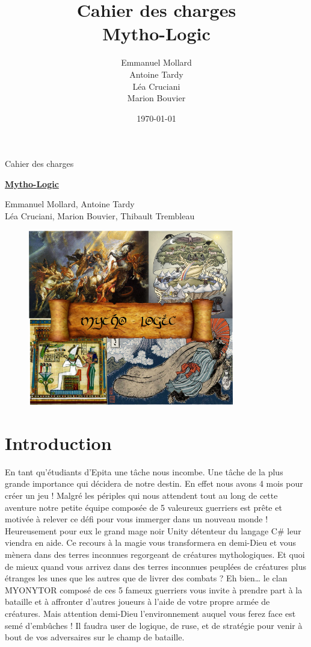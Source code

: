 \documentclass[12pt]{extarticle}
\author{Emmanuel Mollard \\ Antoine Tardy \\ Léa Cruciani \\ Marion Bouvier}
\title{Cahier des charges\\Mytho-Logic}
\date{\today}
\begin{document}
\begin{center}\large
	Cahier des charges \vspace{0.5cm}
\end{center}

\begin{center}\Huge\bfseries
	\underline{Mytho-Logic} \vspace{1cm}
\end{center}

\begin{center}\footnotesize
	Emmanuel Mollard, Antoine Tardy \\ Léa Cruciani, Marion Bouvier, Thibault Trembleau
\end{center}

\begin{figure}[!h]
	\center
	\includegraphics[width=0.8\textwidth]{logo1}
\end{figure}

\newpage

\tableofcontents

\newpage

\section{Introduction}\large

En tant qu’étudiants d’Epita une tâche nous incombe. Une tâche de la plus grande importance qui décidera de notre destin. En effet nous avons 4 mois pour créer un jeu ! Malgré les périples qui nous attendent tout au long de cette aventure notre petite équipe composée de 5 valeureux guerriers est prête et motivée à relever ce défi pour vous immerger dans un nouveau monde ! Heureusement pour eux le grand mage noir Unity détenteur du langage C\# leur viendra en aide. Ce recours à la magie vous transformera en demi-Dieu et vous mènera dans des terres inconnues regorgeant de créatures mythologiques. Et quoi de mieux quand vous arrivez dans des terres inconnues peuplées de créatures plus étranges les unes que les autres que de livrer des combats ? Eh bien… le clan MYONYTOR composé de ces 5 fameux guerriers vous invite à prendre part à la bataille et à affronter d’autres joueurs à l’aide de votre propre armée de créatures. Mais attention demi-Dieu l’environnement auquel vous ferez face est semé d’embûches ! Il faudra user de logique, de ruse, et de stratégie pour venir à bout de vos adversaires sur le champ de bataille.
\end{document}
